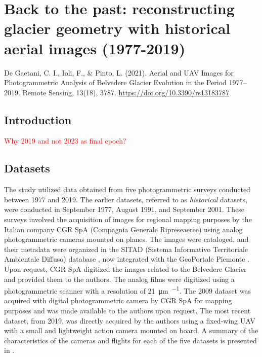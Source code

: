 \graphicspath{{figures/chapter2/}}

\chapter{Back to the past: reconstructing glacier geometry with historical aerial images
  (1977-2019)}\label{ch:2}
  
\vfill


\noindent De Gaetani, C. I., Ioli, F., \& Pinto, L. (2021). Aerial and UAV Images for
Photogrammetric Analysis of Belvedere Glacier Evolution in the Period 1977–2019. Remote
Sensing, 13(18), 3787. \url{https://doi.org/10.3390/rs13183787}

\newpage

\section{Introduction}\label{sec:2:introduction}

\textcolor{red}{Why 2019 and not 2023 as final epoch?}

\section{Datasets}\label{sec:2:datasets}

The study utilized data obtained from five photogrammetric surveys conducted between 1977 and 2019. The earlier datasets, referred to as \textit{historical} datasets, were conducted in September 1977, August 1991, and September 2001. 
These surveys involved the acquisition of images for regional mapping purposes by the Italian company CGR SpA (Compagnia Generale Ripreseaeree) using analog photogrammetric cameras mounted on planes. 
The images were cataloged, and their metadata were organized in the SITAD (Sistema Informativo Territoriale Ambientale Diffuso) database \citep{Cipriano2005_SITAD}, now integrated with the GeoPortale Piemonte \citep{geoportlae_piem}.
Upon request, CGR SpA digitized the images related to the Belvedere Glacier and provided them to the authors. 
The analog films were digitized using a photogrammetric scanner with a resolution of \SI{21}{\micro\meter\per\pixel}. 
The 2009 dataset was acquired with digital photogrammetric camera by CGR SpA for mapping purposes and was made available to the authors upon request.
The most recent dataset, from 2019, was directly acquired by the authors using a fixed-wing UAV with a small and lightweight action camera mounted on board. A summary of the characteristics of the cameras and flights for each of the five datasets is presented in .

